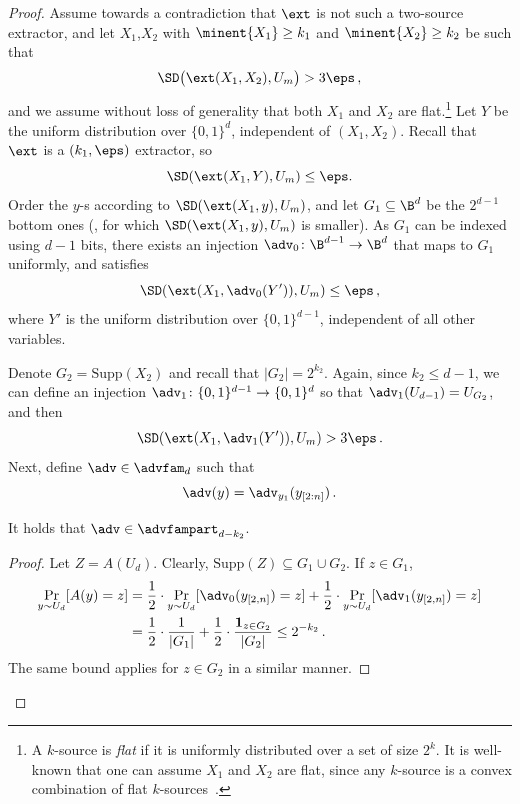 \documentclass{toc}
\begin{document}
\begin{proof}
 Assume towards a contradiction that $\ext$ is not such a two-source extractor, and let $X_1$,$ X_2$ with  $\minent{X_1} \geq k_1$ and $\minent{X_2} \geq k_2$ be such that 
	\[
	\SD\big(\ext(X_1,X_2), U_m \big) > 3\eps\,,
	\]
and we assume without loss of generality that both $X_1$ and $X_2$
are flat.\footnote{A $k$-source is \emph{flat} if it is uniformly distributed over a set of size $2^k$. It is well-known that one can assume $X_1$ and $X_2$ are flat, since any $k$-source is a convex combination of flat $k$-sources~\cite{CG88}.}
	Let $Y$ be the uniform distribution over $\{0,1\}^d$, independent of $(X_1, X_2)$.
	Recall that $\ext$ is a $(k_1, \eps)$ extractor, so 
	\[
	\SD(\ext(X_1,Y) ,U_m) \le \eps.
	\]
Order the $y$-s according to $\SD(\ext(X_1,y),U_m)$, and let $G_1 \subseteq \B^d$
be the $2^{d-1}$ bottom ones (\ie, for which $\SD(\ext(X_1,y),U_m)$ is smaller).
As $G_1$ can be indexed using $d-1$ bits, there exists an injection
$\adv_0 \colon \B^{d-1} \rightarrow \B^{d}$ that maps to $G_1$ uniformly, and satisfies
		\begin{equation}\label{eq:1}
	\SD(\ext(X_1,\adv_0(Y')),U_m) \leq \eps\,,
	\end{equation}
	where $Y'$ is the uniform distribution over $\{0,1\}^{d-1}$, independent of
	all other variables.

Denote $G_2 = \mathrm{Supp}(X_2)$ and recall that $|G_2| = 2^{k_2}$.
Again, since $k_2 \leq d -1$, we can define an injection $\adv_1 \colon \{0,1\}^{d-1} \rightarrow \{0,1\}^d$
so that $\adv_1(U_{d-1}) = U_{G_2}$, and then
	\begin{equation}\label{eq:2}
	\SD(\ext(X_1,\adv_1(Y')),U_m) > 3\eps\,.
	\end{equation}
Next, define $\adv \in \advfam_d$ such that \[\adv(y) = \adv_{y_1}(y_{[2:n]})\,.\]
\begin{claim}
It holds that $\adv\in \advfampart_{d-k_2}$.
\end{claim}
\begin{proof}
Let $Z = A(U_d)$. Clearly, $\mathrm{Supp}(Z) \subseteq G_1 \cup G_2$.
If $z \in G_1$,
\begin{align*}
\Pr_{y \sim U_d}[A(y) = z] &= \frac{1}{2} \cdot \Pr_{y \sim U_d}[\adv_0(y_{[2,n]})  = z]
+ \frac{1}{2} \cdot \Pr_{y \sim U_d}[\adv_1(y_{[2,n]})  = z] \\
&= \frac{1}{2} \cdot \frac{1}{|G_1|} + \frac{1}{2} \cdot \frac{\mathbf{1}_{z \in G_2}}{|G_2|}
\le 2^{-k_2}\,.
\end{align*}
The same bound applies for $z \in G_2$ in a similar manner.
\end{proof}



\end{proof}
\end{document}
